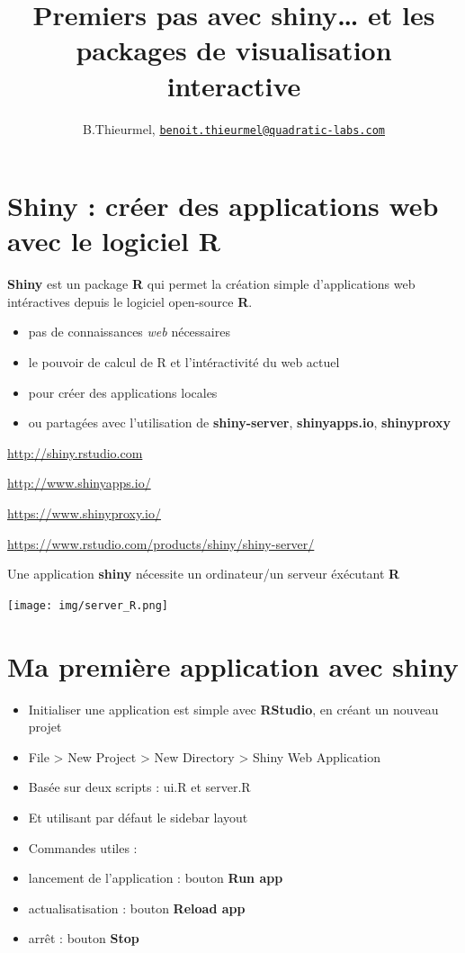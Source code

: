 \documentclass[
]{article}
\title{Premiers pas avec shiny\ldots{} et les packages de visualisation
interactive}
\author{B.Thieurmel,
\href{mailto:benoit.thieurmel@quadratic-labs.com}{\nolinkurl{benoit.thieurmel@quadratic-labs.com}}}
\date{}
\providecommand{\tightlist}{%
  \setlength{\itemsep}{0pt}\setlength{\parskip}{0pt}}
\begin{document}
\maketitle

{
\setcounter{tocdepth}{2}
\tableofcontents
}
\hypertarget{shiny-cruxe9er-des-applications-web-avec-le-logiciel-r}{%
\section{Shiny : créer des applications web avec le logiciel
R}\label{shiny-cruxe9er-des-applications-web-avec-le-logiciel-r}}

\textbf{Shiny} est un package \textbf{R} qui permet la création simple
d'applications web intéractives depuis le logiciel open-source
\textbf{R}.

\begin{itemize}
\tightlist
\item
  pas de connaissances \emph{web} nécessaires
\item
  le pouvoir de calcul de R et l'intéractivité du web actuel
\item
  pour créer des applications locales
\item
  ou partagées avec l'utilisation de \textbf{shiny-server},
  \textbf{shinyapps.io}, \textbf{shinyproxy}
\end{itemize}

\url{http://shiny.rstudio.com}

\url{http://www.shinyapps.io/}

\url{https://www.shinyproxy.io/}

\url{https://www.rstudio.com/products/shiny/shiny-server/}

Une application \textbf{shiny} nécessite un ordinateur/un serveur
éxécutant \textbf{R}

\texttt{[image: img/server\_R.png]}

\hypertarget{ma-premiuxe8re-application-avec-shiny}{%
\section{Ma première application avec
shiny}\label{ma-premiuxe8re-application-avec-shiny}}

\begin{itemize}
\item
  Initialiser une application est simple avec \textbf{RStudio}, en
  créant un nouveau projet
\item
  File \textgreater{} New Project \textgreater{} New Directory
  \textgreater{} Shiny Web Application
\item
  Basée sur deux scripts : ui.R et server.R
\item
  Et utilisant par défaut le sidebar layout
\item
  Commandes utiles :
\item
  lancement de l'application : bouton \textbf{Run app}
\item
  actualisatisation : bouton \textbf{Reload app}
\item
  arrêt : bouton \textbf{Stop}
\end{itemize}
\end{document}

